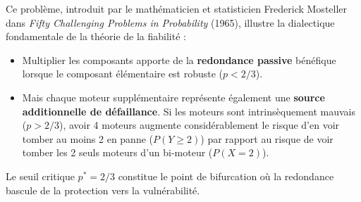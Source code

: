 \documentclass[11pt,a4paper]{article}
\begin{document}
\begin{remarquebox}
Ce problème, introduit par le mathématicien et statisticien Frederick Mosteller dans \emph{Fifty Challenging Problems in Probability} (1965), illustre la dialectique fondamentale de la théorie de la fiabilité :
\begin{itemize}[label=$\bullet$]
    \item Multiplier les composants apporte de la \textbf{redondance passive} bénéfique lorsque le composant élémentaire est robuste ($p < 2/3$).
    \item Mais chaque moteur supplémentaire représente également une \textbf{source additionnelle de défaillance}. Si les moteurs sont intrinsèquement mauvais ($p > 2/3$), avoir 4 moteurs augmente considérablement le risque d'en voir tomber au moins 2 en panne ($P(Y \ge 2)$) par rapport au risque de voir tomber les 2 seuls moteurs d'un bi-moteur ($P(X = 2)$).
\end{itemize}
Le seuil critique $p^* = 2/3$ constitue le point de bifurcation où la redondance bascule de la protection vers la vulnérabilité.
\end{remarquebox}
\end{document}
